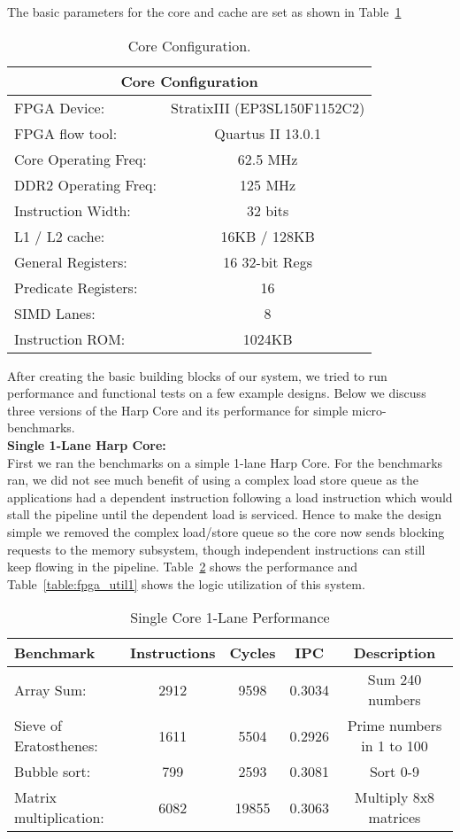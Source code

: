 The basic parameters for the core and cache are set as shown in Table~\ref{table:core_config}
\begin{table}[!htbp]
  \centering
  \begin{tabular}{|l|c|}
    \hline
    \multicolumn{2}{|c|}{Core Configuration} \\
    \hline
FPGA Device:				& StratixIII (EP3SL150F1152C2)\\
FPGA flow tool:				& Quartus II 13.0.1\\
Core Operating Freq:			& 62.5 MHz\\
DDR2 Operating Freq:			& 125 MHz\\
Instruction Width:			& 32 bits\\
L1 / L2 cache:				& 16KB / 128KB\\
General Registers:			& 16 32-bit Regs\\
Predicate Registers:			& 16\\
SIMD Lanes:				& 8\\
Instruction ROM:			& 1024KB\\
    \hline
  \end{tabular}
  \caption{Core Configuration.}
  \label{table:core_config}
\end{table}

After creating the basic building blocks of our system, we tried to run performance and functional tests on a few example designs. Below we discuss three versions of the Harp Core and its performance for simple micro-benchmarks.\\

\noindent\textbf{Single 1-Lane Harp Core:}\\
First we ran the benchmarks on a simple 1-lane Harp Core. For the benchmarks ran, we did not see much benefit of using a complex load store queue as the applications had a dependent instruction following a load instruction which would stall the pipeline until the dependent load is serviced. Hence to make the design simple we removed the complex load/store queue so the core now sends blocking requests to the memory subsystem, though independent instructions can still keep flowing in the pipeline. Table~\ref{table:perf1} shows the performance and Table~\ref{table:fpga_util1} shows the logic utilization of this system.
\begin{table}[!htbp]
  \centering
  \begin{tabular}{|l|c|c|c|c|}
    \hline
Benchmark		&Instructions 	&Cycles		&IPC		&Description\\
    \hline
Array Sum:		&2912		&9598		&0.3034 	&Sum 240 numbers \\
Sieve of Eratosthenes:	&1611		&5504		&0.2926 	&Prime numbers in 1 to 100\\
Bubble sort:		&799		&2593		&0.3081 	&Sort 0-9\\
Matrix multiplication:	&6082		&19855		&0.3063 	&Multiply 8x8 matrices\\
    \hline
  \end{tabular}
  \caption{Single Core 1-Lane Performance}
  \label{table:perf1}
\end{table}

